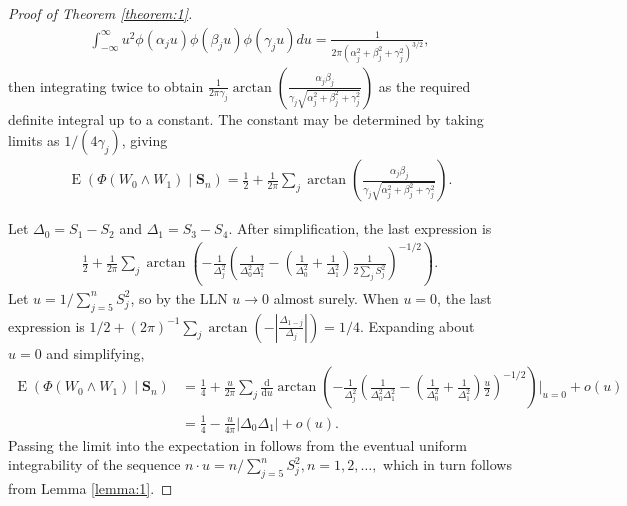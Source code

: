 \documentclass[12pt]{article}
\newcommand{\s}{S}
\newcommand{\w}{W}
\renewcommand{\vec}[1]{\textbf{#1}}
\DeclareMathOperator{\E}{E}
\newcommand{\comment}[1]{
  \iftoggle{commenttoggle}{
    {\normalsize{\color{red}{ #1}}\normalsize}
  }
  {}
}
\begin{document}
\begin{proof}[Proof of Theorem \ref{theorem:1}]
    \begin{align}
      \int_{-\infty}^\infty u^2\phi(\alpha_j u)\phi(\beta_j u)\phi(\gamma_j u)du=\frac{1}{2\pi(\alpha_j^2+\beta_j^2+\gamma_j^2)^{3/2}},
    \end{align}
    then integrating  twice to obtain $\frac{1}{2\pi\gamma_j}\arctan\left(\frac{\alpha_j\beta_j}{\gamma_j\sqrt{\alpha_j^2+\beta_j^2+\gamma_j^2}}\right)$ as the required definite integral up to a constant. The constant may be determined by taking limits as $1/(4\gamma_j)$, giving
    \begin{align}
      \E\left(\Phi(\w_0\wedge \w_1)\mid \vec{\s}_n\right) =\frac{1}{2}+\frac{1}{2\pi}\sum_j\arctan\left(\frac{\alpha_j\beta_j}{\gamma_j\sqrt{\alpha_j^2+\beta_j^2+\gamma_j^2}}\right).     
    \end{align}

    Let $\Delta_0=\s_1-\s_2$ and $\Delta_1=\s_3-\s_4$. After simplification, the last expression is
    \begin{align}
      \frac{1}{2}+\frac{1}{2\pi}\sum_j\arctan\left(-\frac{1}{\Delta_j^2}\left(\frac{1}{\Delta_0^2\Delta_1^2}-\left(\frac{1}{\Delta_0^2}+\frac{1}{\Delta_1^2}\right)\frac{1}{2\sum_j\s_j^2}\right)^{-1/2}\right).
    \end{align}
    Let $u=1/\sum_{j=5}^n\s_j^2$, so by the LLN $u\to 0$ almost surely. When $u=0$, the last expression is $1/2 + (2\pi)^{-1}\sum_j \arctan\left(-|\frac{\Delta_{1-j}}{\Delta_j}|\right)=1/4$. Expanding about $u=0$ and simplifying, 
    \begin{align}
      \E\left(\Phi(\w_0\wedge \w_1)\mid \vec{\s}_n\right) &=\frac{1}{4} + \frac{u}{2\pi}\sum_j\frac{\mathrm{d}}{\mathrm{d} u}\arctan\left(-\frac{1}{\Delta_j^2}\left(\frac{1}{\Delta_0^2\Delta_1^2}-\left(\frac{1}{\Delta_0^2}+\frac{1}{\Delta_1^2}\right)\frac{u}{2}\right)^{-1/2}\right)\bigg|_{u=0} + o(u)\\
      &=\frac{1}{4}-\frac{u}{4\pi}|\Delta_0\Delta_1| + o(u).
    \end{align}
    Passing the limit into the expectation in  follows from the
    eventual uniform integrability of the sequence
    $n\cdot u=n/\sum_{j=5}^n \s_j^2, n=1,2,\ldots,$ which in turn follows from Lemma    \ref{lemma:1}.
    
    
      \end{proof}
\end{document}
